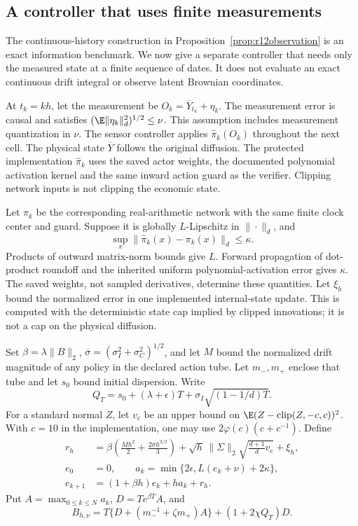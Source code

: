 \subsection{A controller that uses finite measurements}\label{sec:r13sensing}
The continuous-history construction in Proposition~\ref{prop:r12observation} is an exact information benchmark. We now give a separate controller that needs only the measured state at a finite sequence of dates. It does not evaluate an exact continuous drift integral or observe latent Brownian coordinates.

At $t_k=kh$, let the measurement be $O_k=\overline Y_{t_k}+\eta_k$. The measurement error is causal and satisfies $(\E\|\eta_k\|_d^2)^{1/2}\leq\nu$. This assumption includes measurement quantization in $\nu$. The sensor controller applies $\widehat\pi_k(O_k)$ throughout the next cell. The physical state $\overline Y$ follows the original diffusion. The protected implementation $\widehat\pi_k$ uses the saved actor weights, the documented polynomial activation kernel and the same inward action guard as the verifier. Clipping network inputs is not clipping the economic state.

Let $\pi_k$ be the corresponding real-arithmetic network with the same finite clock center and guard. Suppose it is globally $L$-Lipschitz in $\|\cdot\|_d$, and
\[
 \sup_x\|\widehat\pi_k(x)-\pi_k(x)\|_d\leq\kappa.
\]
Products of outward matrix-norm bounds give $L$. Forward propagation of dot-product roundoff and the inherited uniform polynomial-activation error gives $\kappa$. The saved weights, not sampled derivatives, determine these quantities. Let $\xi_h$ bound the normalized error in one implemented internal-state update. This is computed with the deterministic state cap implied by clipped innovations; it is not a cap on the physical diffusion.

Set $\beta=\lambda\|B\|_2$, $\overline\sigma=(\sigma_I^2+\sigma_C^2)^{1/2}$, and let $M$ bound the normalized drift magnitude of any policy in the declared action tube. Let $m_-,m_+$ enclose that tube and let $s_0$ bound initial dispersion. Write
\[
 Q_T=s_0+(\lambda+\epsilon)T
          +\sigma_I\sqrt{(1-1/d)T}.
\]
For a standard normal $Z$, let $v_c$ be an upper bound on $\E(Z-\operatorname{clip}(Z,-c,c))^2$. With $c=10$ in the implementation, one may use $2\varphi(c)(c+c^{-1})$. Define
\begin{align*}
 r_h&=\beta\left(\frac{Mh^2}{2}
                  +\frac{2\overline\sigma h^{3/2}}{3}\right)
       +\sqrt h\,\|\Sigma\|_2\sqrt{\frac{d+1}{d}v_c}+\xi_h,\\
 e_0&=0,\qquad
 a_k=\min\{2\epsilon,L(e_k+\nu)+2\kappa\},\\
 e_{k+1}&=(1+\beta h)e_k+h a_k+r_h.
\end{align*}
Put $A=\max_{0\leq k\leq N}a_k$, $D=T e^{\beta T}A$, and
\begin{equation}\label{eq:r13sensor}
 B_{h,\nu}=T\{D+(m_-^{-1}+\zeta m_+)A\}
                  +(1+2\chi Q_T)D.
\end{equation}

